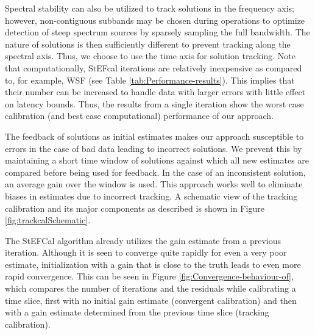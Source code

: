 \documentclass{aa}
\begin{document}
Spectral  stability can also  be utilized  to track  solutions in  the frequency
axis;  however,  non-contiguous subbands  may  be  chosen  during operations  to
optimize  detection of  steep spectrum  sources  by sparsely  sampling the  full
bandwidth. The  nature of  solutions is then  sufficiently different  to prevent
tracking  along the spectral  axis. Thus,  we choose  to use  the time  axis for
solution tracking. Note that  computationally, StEFcal iterations are relatively
inexpensive    as    compared    to,     for    example,    WSF    (see    Table
\ref{tab:Performance-results}).  This implies that their number can be increased
to handle data  with larger errors with little effect  on latency bounds.  Thus,
the results  from a single iteration  show the worst case  calibration (and best
case computational) performance of our approach.

The feedback of solutions as initial estimates makes our approach susceptible to
errors in the case of bad  data leading to incorrect solutions.  We prevent this
by maintaining a short time window  of solutions against which all new estimates
are compared  before being used  for feedback.  In  the case of  an inconsistent
solution, an average gain over the  window is used.  This approach works well to
eliminate biases in estimates due to incorrect tracking. A schematic view of the
tracking calibration  and its major components  as described is  shown in Figure
\ref{fig:trackcalSchematic}.

The  StEFCal  algorithm already  utilizes  the  gain  estimate from  a  previous
iteration. Although  it is seen to converge  quite rapidly for even  a very poor
estimate, initialization  with a gain that is  close to the truth  leads to even
more     rapid    convergence.      This     can    be     seen    in     Figure
\ref{fig:Convergence-behaviour-of}, which compares  the number of iterations and
the  residuals  while calibrating  a  time slice,  first  with  no initial  gain
estimate (convergent calibration)  and then with a gain  estimate determined from
the previous time slice (tracking calibration).
\end{document}
